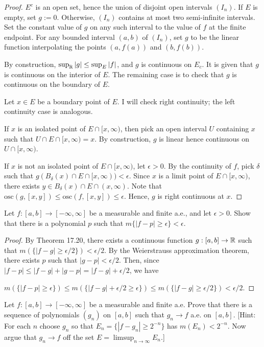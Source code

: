 \documentclass{article}
\newcommand{\osc}{\mathrm{osc}}
\begin{document}
\begin{proof}
$E^c$ is an open set, hence the union of disjoint open intervals $(I_n)$. If $E$ is empty, set $g:= 0$.  Otherwise, $(I_n)$ contains at most two semi-infinite intervals. Set the constant value of $g$ on any such interval to the value of $f$ at the finite endpoint.  For any bounded interval $(a,b)$ of $(I_n)$, set $g$ to be the linear function interpolating the points $(a, f(a))$ and $(b,f(b))$.

By construction, $\sup_{\mathbb{R}} |g| \le \sup_E |f|$, and $g$ is continuous on $E_c$.  It is given that $g$ is continuous on the interior of $E$.  The remaining case is to check that $g$ is continuous on the boundary of $E$.

Let $x \in E$ be a boundary point of $E$.  I will check right continuity; the left continuity case is analogous.

 If $x$ is an isolated point of $E \cap [x, \infty)$, then pick an open interval $U$ containing $x$ such that $U \cap E \cap [x, \infty) = x$.  By construction, $g$ is linear hence continuous on $U \cap [x,\infty)$.

If $x$ is not an isolated point of $E \cap [x, \infty)$, let $\epsilon > 0$. By the continuity of $f$, pick $\delta$ such that $g(B_\delta(x) \cap E \cap [x,\infty)) < \epsilon$. Since $x$ is a limit point of $E \cap [x, \infty)$, there exists $y \in B_\delta(x) \cap E \cap (x,\infty)$. Note that $\osc(g, [x,y]) \le \osc(f, [x,y]) \le \epsilon$. Hence, $g$ is right continuous at $x$.
\end{proof}
 Let $f: [a,b] \to [-\infty,\infty]$ be a measurable and finite a.e., and let $\epsilon > 0$. Show that there is a polynomial $p$ such that $m\{|f - p| \ge \epsilon\} < \epsilon$.
\begin{proof} 
By Theorem 17.20, there exists a continuous function $g:[a,b] \to \mathbb{R}$ such that $m(\{|f - g| \ge \epsilon/2\}) < \epsilon/2$.  By the Weierstrauss approximation theorem, there exists $p$ such that $|g-p| < \epsilon/2$.  Then, 
since $|f - p| \le |f - g| + |g - p| = |f - g| + \epsilon/2$, we have

 $m(\{|f - p| \ge \epsilon\}) \le m(\{|f - g| + \epsilon/2 \ge \epsilon\}) \le m(\{|f - g| \ge \epsilon/2\})  < \epsilon/2.$
\end{proof}
 Let $f: [a,b] \to [-\infty,\infty]$ be a measurable and finite a.e. Prove that there is a sequence of polynomials $(g_n)$ on $[a,b]$ such that $g_n \to f$ a.e. on $[a,b]$. [Hint: For each $n$ choose $g_n$ so that $E_n = \{|f-g_n| \ge 2^{-n}\}$ has $m(E_n) < 2^{-n}$. Now argue that $g_n \to f$ off the set $E = \limsup_{n\to\infty} E_n$.]
\end{document}

